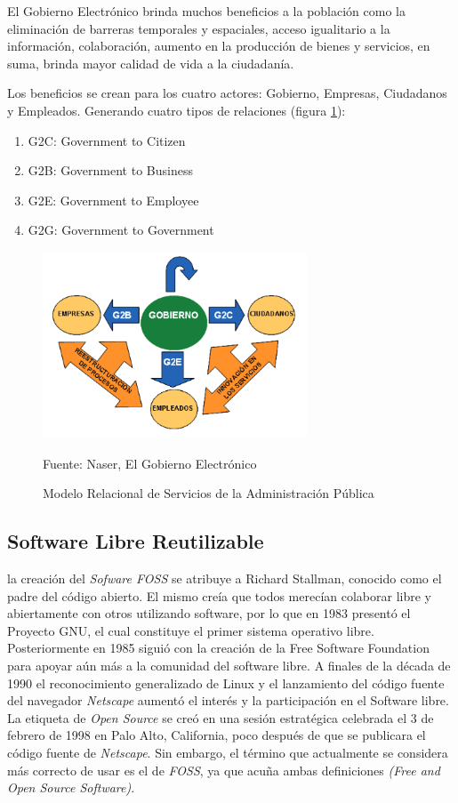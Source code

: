 El Gobierno Electrónico brinda muchos beneficios a la población como la eliminación de barreras temporales y espaciales, acceso igualitario a la información, colaboración, aumento en la producción de bienes y servicios, en suma, brinda mayor calidad de vida a la ciudadanía.

Los beneficios se crean para los cuatro actores: Gobierno, Empresas, Ciudadanos y Empleados. Generando cuatro tipos de relaciones (figura \ref{fig:g2all}):

\begin{enumerate}
    \item G2C: Government to Citizen
    \item G2B: Government to Business
    \item G2E: Government to Employee
    \item G2G: Government to Government
\end{enumerate}

\begin{figure}[!h]
    \centering
    \includegraphics[width=0.7\textwidth]{assets/g2all}
    \caption{Modelo Relacional de Servicios de la Administración Pública}{Fuente: Naser, El Gobierno Electrónico}
    \label{fig:g2all}
\end{figure}

\subsection{Software Libre Reutilizable}

la creación del \textit{Sofware FOSS} se atribuye a Richard Stallman, conocido como el padre del código abierto. El mismo creía que todos merecían colaborar libre y abiertamente con otros utilizando software, por lo que en 1983 presentó el Proyecto GNU, el cual constituye el primer sistema operativo libre. Posteriormente en 1985 siguió con la creación de la Free Software Foundation para apoyar aún más a la comunidad del software libre. A finales de la década de 1990 el reconocimiento generalizado de Linux y el lanzamiento del código fuente del navegador \textit{Netscape} aumentó el interés y la participación en el Software libre. La etiqueta de \textit{Open Source} se creó en una sesión estratégica celebrada el 3 de febrero de 1998 en Palo Alto, California, poco después de que se publicara el código fuente de \textit{Netscape}. Sin embargo, el término que actualmente se considera más correcto de usar es el de \textit{FOSS}, ya que acuña ambas definiciones \textit{(Free and Open Source Software)}. 

